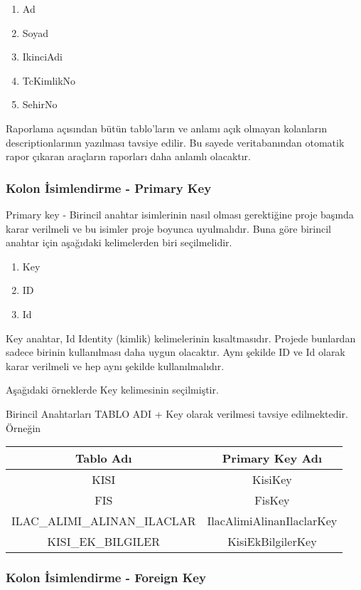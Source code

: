 \documentclass[10pt,a4paper,draft]{article}
\begin{document}
\begin{enumerate}
\item Ad
\item Soyad
\item IkinciAdi
\item TcKimlikNo
\item SehirNo
\end{enumerate}

Raporlama açısından bütün tablo'ların ve anlamı açık olmayan kolanların descriptionlarının yazılması tavsiye edilir.
Bu sayede veritabanından otomatik rapor çıkaran araçların raporları daha anlamlı olacaktır.
	
  
  
\subsubsection{Kolon İsimlendirme - Primary Key}
Primary key - Birincil anahtar isimlerinin nasıl olması gerektiğine proje başında karar verilmeli ve bu isimler
proje boyunca uyulmalıdır.
Buna göre birincil anahtar için aşağıdaki kelimelerden biri seçilmelidir.
\begin{enumerate}
\item Key
\item ID
\item Id
\end{enumerate}
Key anahtar, Id Identity (kimlik) kelimelerinin kısaltmasıdır.
Projede bunlardan sadece birinin kullanılması daha uygun olacaktır.
Aynı şekilde ID ve Id olarak karar verilmeli ve hep aynı şekilde kullanılmalıdır.

Aşağıdaki örneklerde Key kelimesinin seçilmiştir.

Birincil Anahtarları TABLO ADI + Key olarak verilmesi tavsiye edilmektedir.
Örneğin

\begin{tabular}{|c|c|}
\hline Tablo Adı & Primary Key Adı \\ 
\hline KISI & KisiKey \\ 
\hline FIS & FisKey \\ 
\hline ILAC\_ALIMI\_ALINAN\_ILACLAR & IlacAlimiAlinanIlaclarKey \\ 
\hline  KISI\_EK\_BILGILER & KisiEkBilgilerKey \\ 
\hline 
\end{tabular} 



\subsubsection{Kolon İsimlendirme - Foreign Key}
\end{document}
